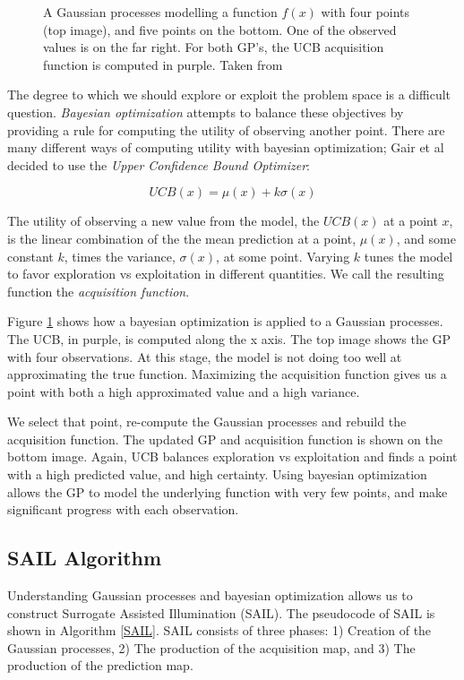 \documentclass{sig-alternate}
\begin{document}
\begin{figure}[htb]
\centering
{}
\caption{A Gaussian processes modelling a function $f(x)$ with four points (top image), and five points on the bottom.
One of the observed values is on the far right.
For both GP's, the UCB acquisition function is computed in purple.
Taken from \cite{rand:BayesianOptimization}}
\label{fig:BO5}
\end{figure}

The degree to which we should explore or exploit the problem space is a difficult question.
\textit{Bayesian optimization} attempts to balance these objectives by providing a rule for computing the utility of observing another point.
There are many different ways of computing utility with bayesian optimization;
Gair et al decided to use the \textit{Upper Confidence Bound Optimizer}:

\[ UCB(x) = \mu(x) + k\sigma(x) \]

The utility of observing a new value from the model, the $UCB(x)$ at a point $x$, is the linear combination of the the mean prediction at a point, $\mu(x)$, and some constant $k$, times the variance, $\sigma(x)$, at some point.
Varying $k$ tunes the model to favor exploration vs exploitation in different quantities. We call the resulting function the \textit{acquisition function}.

Figure \ref{fig:BO5} shows how a bayesian optimization is applied to a Gaussian processes.
The UCB, in purple, is computed along the x axis.
The top image shows the GP with four observations.
At this stage, the model is not doing too well at approximating the true function.
Maximizing the acquisition function gives us a point with both a high approximated value and a high variance. 

We select that point, re-compute the Gaussian processes and rebuild the acquisition function.
The updated GP and acquisition function is shown on the bottom image.
Again, UCB balances exploration vs exploitation and finds a point with a high predicted value, and high certainty.
Using bayesian optimization allows the GP to model the underlying function with very few points, and make significant progress with each observation. 

\subsection{SAIL Algorithm}
\label{SAILAlgorithm}

Understanding Gaussian processes and bayesian optimization allows us to construct Surrogate Assisted Illumination (SAIL).
The pseudocode of SAIL is shown in Algorithm \ref{SAIL}.
SAIL consists of three phases: 
1) Creation of the Gaussian processes, 
2) The production of the acquisition map, and
3) The production of the prediction map. 
\end{document}
